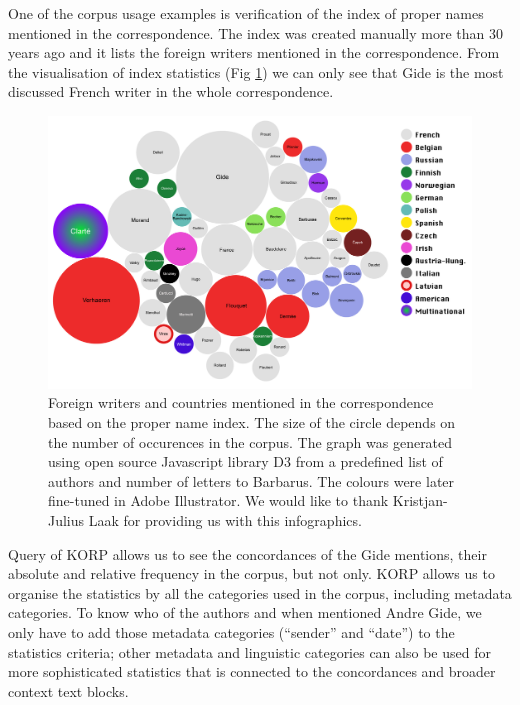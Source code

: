 \documentclass[runningheads]{llncs}
\begin{document}
One of the corpus usage examples is verification of the index of proper names mentioned in the correspondence. The index was created manually more than 30 years ago and it lists the foreign writers mentioned in the correspondence. From the visualisation of index statistics (Fig \ref{fig2}) we can only see that Gide is the most discussed French writer in the whole correspondence.

\begin{figure}
  \includegraphics[width=\textwidth]{mummud}
  \caption{Foreign writers and countries mentioned in the correspondence based on the proper name index.  The size of the circle depends on the number of occurences in the corpus. The graph was generated using open source Javascript library D3 from a predefined list of authors and number of letters to Barbarus.
    The colours were later fine-tuned in Adobe Illustrator.  We would like to thank Kristjan-Julius Laak for providing us with this infographics.}
  \label{fig2}
\end{figure}


Query of KORP allows us to see the concordances of the Gide mentions, their absolute and relative frequency in the corpus, but not only. KORP allows us to organise the statistics by all the categories used in the corpus, including metadata categories. To know who of the authors and when mentioned Andre Gide, we only have to add those metadata categories (``sender'' and ``date'') to the statistics criteria; other metadata and linguistic categories can also be used for more sophisticated statistics that is connected to the concordances and broader context text blocks. 
\end{document}
